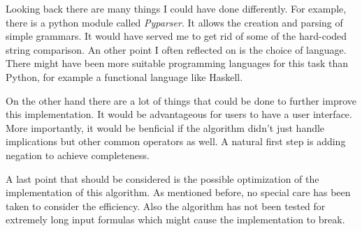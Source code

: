 Looking back there are many things I could have done differently. For example, there is a python module called \emph{Pyparser}\cite{pypar}. It allows the creation and parsing of simple grammars. It would have served me to get rid of some of the hard-coded string comparison. An other point I often reflected on is the choice of language. There might have been more suitable programming languages for this task than Python, for example a functional language like Haskell. 

On the other hand there are a lot of things that could be done to further improve this implementation. It would be advantageous for users to have a user interface. More importantly, it would be benficial if the algorithm didn't just handle implications but other common operators as well. A natural first step is adding negation to achieve completeness.

A last point that should be considered is the possible optimization of the implementation of this algorithm. As mentioned before, no special care has been taken to consider the efficiency. Also the algorithm has not been tested for extremely long input formulas which might cause the implementation to break. 